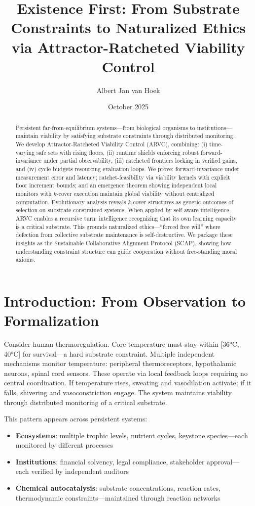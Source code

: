 \documentclass[11pt,a4paper]{article}
\title{Existence First: From Substrate Constraints to Naturalized Ethics via Attractor-Ratcheted Viability Control}
\author{Albert Jan van Hoek}
\date{October 2025}
\theoremstyle{definition}
\begin{document}
\maketitle

\begin{abstract}
Persistent far-from-equilibrium systems---from biological organisms to institutions---maintain viability by satisfying substrate constraints through distributed monitoring. We develop Attractor-Ratcheted Viability Control (ARVC), combining: (i) time-varying safe sets with rising floors, (ii) runtime shields enforcing robust forward-invariance under partial observability, (iii) ratcheted frontiers locking in verified gains, and (iv) cycle budgets resourcing evaluation loops. We prove: forward-invariance under measurement error and latency; ratchet-feasibility via viability kernels with explicit floor increment bounds; and an emergence theorem showing independent local monitors with $k$-cover execution maintain global viability without centralized computation. Evolutionary analysis reveals $k$-cover structures as generic outcomes of selection on substrate-constrained systems. When applied by self-aware intelligence, ARVC enables a recursive turn: intelligence recognizing that its own learning capacity is a critical substrate. This grounds naturalized ethics---``forced free will'' where defection from collective substrate maintenance is self-destructive. We package these insights as the Sustainable Collaborative Alignment Protocol (SCAP), showing how understanding constraint structure can guide cooperation without free-standing moral axioms.
\end{abstract}

\section{Introduction: From Observation to Formalization}

Consider human thermoregulation. Core temperature must stay within [36°C, 40°C] for survival---a hard substrate constraint. Multiple independent mechanisms monitor temperature: peripheral thermoreceptors, hypothalamic neurons, spinal cord sensors. These operate via local feedback loops requiring no central coordination. If temperature rises, sweating and vasodilation activate; if it falls, shivering and vasoconstriction engage. The system maintains viability through distributed monitoring of a critical substrate.

This pattern appears across persistent systems:
\begin{itemize}
\item \textbf{Ecosystems}: multiple trophic levels, nutrient cycles, keystone species---each monitored by different processes
\item \textbf{Institutions}: financial solvency, legal compliance, stakeholder approval---each verified by independent auditors
\item \textbf{Chemical autocatalysis}: substrate concentrations, reaction rates, thermodynamic constraints---maintained through reaction networks
\end{itemize}
\end{document}
